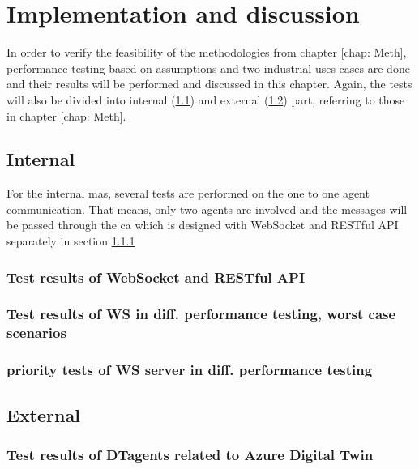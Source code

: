 \chapter{Implementation and discussion} \label{chap: Result}

In order to verify the feasibility of the methodologies from chapter \ref{chap: Meth}, 
performance testing based on assumptions and two industrial uses cases 
are done and their results will be performed and discussed in this chapter. 
Again, the tests will also be divided into internal (\ref{chap: Result-Internal}) 
and external (\ref{chap: Result-External}) part, referring to those in chapter \ref{chap: Meth}.

\section{Internal}\label{chap: Result-Internal}
For the internal \gls{mas}, several tests are performed on the one to one 
agent communication. That means, only two agents are involved and the messages 
will be passed through the \gls{ca} which is designed with WebSocket 
and RESTful API separately in section \ref{chap: Result-RestFUL_WS}
\subsection{Test results of WebSocket and RESTful API} \label{chap: Result-RestFUL_WS}

\subsection{Test results of WS in diff. performance testing, worst case scenarios} \label{chap: Result-WS}

\subsection{priority tests of WS server in diff. performance testing} \label{chap: Result-priority}

\section{External}\label{chap: Result-External}

\subsection{Test results of DTagents related to Azure Digital Twin} \label{chap: Result-DT}